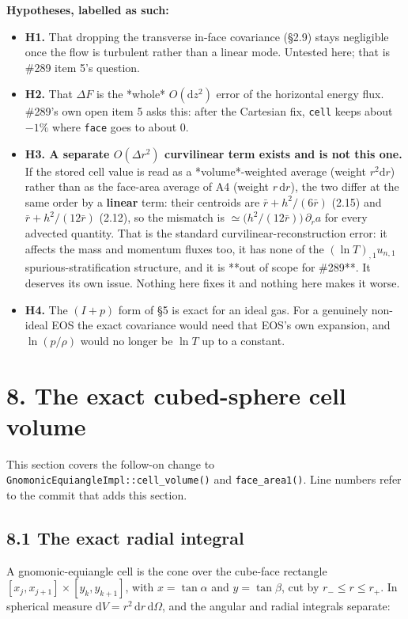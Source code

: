 \documentclass[11pt,a4paper]{article}
\begin{document}
\textbf{Hypotheses, labelled as such:}

\begin{itemize}
\item \textbf{H1.} That dropping the transverse in-face covariance (§2.9) stays negligible
  once the flow is turbulent rather than a linear mode. Untested here; that is
  \#289 item 5's question.
\item \textbf{H2.} That $\Delta F$ is the *whole* $O(\mathrm{d}z^2)$ error of the
  horizontal energy flux. \#289's own open item 5 asks this: after the Cartesian
  fix, \texttt{cell} keeps about $-1\%$ where \texttt{face} goes to about $0$.
\item \textbf{H3. A separate $O(\Delta r^2)$ curvilinear term exists and is not this one.}
  If the stored cell value is read as a *volume*-weighted average (weight
  $r^2\mathrm{d}r$) rather than as the face-area average of A4 (weight
  $r\,\mathrm{d}r$), the two differ at the same order by a \textbf{linear} term: their
  centroids are $\bar r+h^2/(6\bar r)$ (2.15) and $\bar r+h^2/(12\bar r)$ (2.12),
  so the mismatch is $\simeq\big(h^2/(12\bar r)\big)\,\partial_r a$ for every
  advected quantity. That is the standard curvilinear-reconstruction error: it
  affects the mass and momentum fluxes too, it has none of the
  $(\ln T)_{,1}u_{n,1}$ spurious-stratification structure, and it is **out of
  scope for \#289**. It deserves its own issue. Nothing here fixes it and nothing
  here makes it worse.
\item \textbf{H4.} The $(I+p)$ form of §5 is exact for an ideal gas. For a genuinely
  non-ideal EOS the exact covariance would need that EOS's own expansion, and
  $\ln(p/\rho)$ would no longer be $\ln T$ up to a constant.
\end{itemize}

\section*{8. The exact cubed-sphere cell volume}

This section covers the follow-on change to \texttt{GnomonicEquiangleImpl::cell\_volume()} and
\texttt{face\_area1()}. Line numbers refer to the commit that adds this section.

\subsection*{8.1 The exact radial integral}

A gnomonic-equiangle cell is the cone over the cube-face rectangle
$[x_j, x_{j+1}]\times[y_k, y_{k+1}]$, with $x=\tan\alpha$ and $y=\tan\beta$, cut by
$r_- \le r \le r_+$. In spherical measure $\mathrm{d}V = r^2\,\mathrm{d}r\,\mathrm{d}\Omega$, and the
angular and radial integrals separate:
\end{document}
